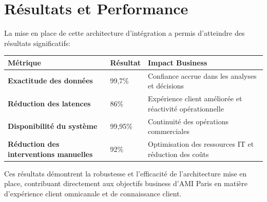 \section{Résultats et Performance}

La mise en place de cette architecture d'intégration a permis d'atteindre des résultats significatifs:

\begin{center}
\begin{tabular}{|>{\bfseries}p{5cm}|p{4cm}|p{6cm}|}
\hline
\rowcolor{lightblue} Métrique & Résultat & Impact Business \\
\hline
Exactitude des données & 99,7\% & Confiance accrue dans les analyses et décisions \\
\hline
Réduction des latences & 86\% & Expérience client améliorée et réactivité opérationnelle \\
\hline
Disponibilité du système & 99,95\% & Continuité des opérations commerciales \\
\hline
Réduction des interventions manuelles & 92\% & Optimisation des ressources IT et réduction des coûts \\
\hline
\end{tabular}
\end{center}

Ces résultats démontrent la robustesse et l'efficacité de l'architecture mise en place, contribuant directement aux objectifs business d'AMI Paris en matière d'expérience client omnicanale et de connaissance client.
